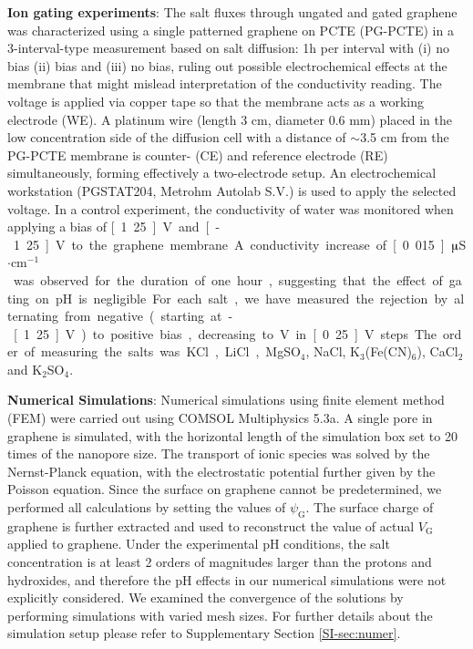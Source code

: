 \documentclass[journal=nalefd,email=true, hyperref=true, keywords=false]{achemso}
\begin{document}
\vspace{1em}
\noindent
\textbf{Ion gating experiments}: 
{ The salt fluxes through ungated and gated graphene
was characterized using a single patterned graphene on PCTE (PG-PCTE)} 
in a 3-interval-type measurement based on salt diffusion: 1h per interval
with (i) no bias (ii) bias and (iii) no bias, ruling out possible
electrochemical effects at the membrane that might mislead
interpretation of the conductivity reading. The voltage is applied via
copper tape so that the membrane acts as a working electrode (WE). A
platinum wire (length 3 cm, diameter 0.6 mm) placed in the low
concentration side of the diffusion cell with a distance of $\sim$3.5 cm
from the PG-PCTE membrane is counter- (CE) and reference electrode
(RE) simultaneously, forming effectively a two-electrode setup. An
electrochemical workstation (PGSTAT204, Metrohm Autolab S.V.) is used
to apply the selected voltage.
{ In a control experiment, the conductivity of water was monitored when applying a bias of \unit[1.25]{V} and \unit[-1.25]{V} to the graphene membrane. A conductivity increase of \unit[0.015]{$\muup$S$\cdot$cm$^{-1}$} was observed for the duration of one hour, suggesting that the effect of gating on pH is negligible.

  For each salt, we have measured the rejection by alternating from
  negative (starting at -\unit[1.25]{V}) to positive bias, decreasing
  to \unit[0]{V} in \unit[0.25]{V} steps. The order of measuring the
  salts was KCl, LiCl, MgSO$_4$, NaCl, K$_3$(Fe(CN)$_6$), CaCl$_2$ and
  K$_2$SO$_4$.}

\vspace{1em}
\noindent
\textbf{Numerical Simulations}: Numerical simulations using finite
element method (FEM) were carried out using COMSOL Multiphysics
5.3a. A single pore in graphene is simulated, with the horizontal
length of the simulation box set to 20 times of the nanopore size. The
transport of ionic species was solved by the Nernst-Planck equation,
with the electrostatic potential further given by the Poisson
equation. Since the surface on graphene cannot be predetermined, we
performed all calculations by setting the values of
$\psi_{\mathrm{G}}$. The surface charge of graphene is further
extracted and used to reconstruct the value of actual $V_{\mathrm{G}}$
applied to graphene. 
{
Under the experimental pH conditions, the salt concentration is at least 2 orders of magnitudes larger than the protons and hydroxides, and therefore the pH effects in our numerical simulations were not explicitly considered.
}
We examined the convergence of the solutions by
performing simulations with varied mesh sizes. For further details
about the simulation setup please refer to Supplementary Section
\ref{SI-sec:numer}.
\end{document}
